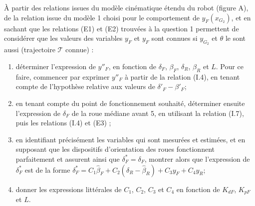 \documentclass[11pt]{article}
\begin{document}
\UPSTIquestion À partir des relations issues du modèle cinématique étendu du robot (figure A), de la relation issue
du modèle 1 choisi pour le comportement de $y_F\left(x_{G_2}\right)$, et en sachant que les relations (E1) et (E2) trouvées à la question 1 permettent de considérer que les valeurs des variables $y_F$ et $y_F$ sont connues si $y_{G_2}$ et $\theta$ le sont aussi (trajectoire $\mathcal{T}$ connue) :
\begin{enumerate}
\item déterminer l’expression de $y''_F$, en fonction de $\delta_F$, $\beta_F$, $\delta_R$, $\beta_R$ et $L$. Pour ce faire, commencer par exprimer $y''_F$ à partir de la relation (I.4), en tenant compte de l’hypothèse relative aux valeurs de $\delta'_F-\beta'_F$;
\item en tenant compte du point de fonctionnement souhaité, déterminer ensuite l’expression de $\delta_F$ de la roue
médiane avant 5, en utilisant la relation (I.7), puis les relations (I.4) et (E3) ;
\item en identifiant précisément les variables qui sont mesurées et estimées, et en supposant que les dispositifs
d’orientation des roues fonctionnent parfaitement et assurent ainsi que $\delta^*_F = \delta_F$, montrer alors que l’expression de $\delta^*_F$ est de la forme $\delta^*_F =C_1 \hat{\beta}_F +C_2\left(\delta_R - \hat{\beta}_R\right)+C_3 y_F + C_4 y_R$;
\item donner les expressions littérales de $C_1$, $C_2$, $C_3$ et $C_4$ en fonction de $K_{dF}$, $K_{pF}$ et $L$.
\end{enumerate}


 
 
\end{document}
